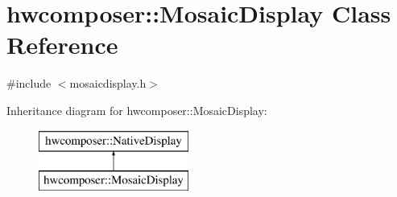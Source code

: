 \hypertarget{classhwcomposer_1_1MosaicDisplay}{}\section{hwcomposer\+:\+:Mosaic\+Display Class Reference}
\label{classhwcomposer_1_1MosaicDisplay}


{\ttfamily \#include $<$mosaicdisplay.\+h$>$}

Inheritance diagram for hwcomposer\+:\+:Mosaic\+Display\+:\begin{figure}[H]
\begin{center}
\leavevmode
\includegraphics[height=2.000000cm]{classhwcomposer_1_1MosaicDisplay}
\end{center}
\end{figure}
